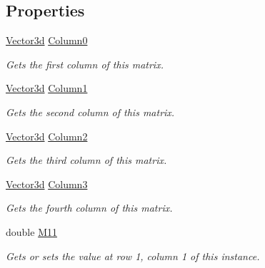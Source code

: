 \subsection*{Properties}
\begin{DoxyCompactItemize}
\item 
\hyperlink{struct_open_t_k_1_1_vector3d}{Vector3d} \hyperlink{struct_open_t_k_1_1_matrix3x4d_a594edb2d3bb149cc0ad0e03686d65a71}{Column0}
\begin{DoxyCompactList}\small\item\em Gets the first column of this matrix. \end{DoxyCompactList}\item 
\hyperlink{struct_open_t_k_1_1_vector3d}{Vector3d} \hyperlink{struct_open_t_k_1_1_matrix3x4d_a0716f10d4c2ebcc8a276d750907d0892}{Column1}
\begin{DoxyCompactList}\small\item\em Gets the second column of this matrix. \end{DoxyCompactList}\item 
\hyperlink{struct_open_t_k_1_1_vector3d}{Vector3d} \hyperlink{struct_open_t_k_1_1_matrix3x4d_a321aae508c957da6105a9cba4fce3321}{Column2}
\begin{DoxyCompactList}\small\item\em Gets the third column of this matrix. \end{DoxyCompactList}\item 
\hyperlink{struct_open_t_k_1_1_vector3d}{Vector3d} \hyperlink{struct_open_t_k_1_1_matrix3x4d_aaa4b36017ebc8af9415af7f2298807dd}{Column3}
\begin{DoxyCompactList}\small\item\em Gets the fourth column of this matrix. \end{DoxyCompactList}\item 
double \hyperlink{struct_open_t_k_1_1_matrix3x4d_addeb2fcf84838d05bf7e900bc422d99a}{M11}
\begin{DoxyCompactList}\small\item\em Gets or sets the value at row 1, column 1 of this instance. \end{DoxyCompactList}\item 

\end{DoxyCompactItemize}
